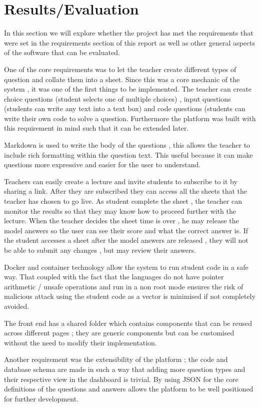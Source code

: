 \chapter{Results/Evaluation}

In this section we will explore whether the project has met the requirements that were set in the requirements section of this report as well as other general aspects of the software that can be evaluated.

One of the core requirements was to let the teacher create different types of question and collate them into a sheet. Since this was a core mechanic of the system , it was one of the first things to be implemented. The teacher can create choice questions (student selects one of multiple choices) , input questions (students can write any text into a text box) and code questions (students can write their own code to solve a question. Furthermore the platform was built with this requirement in mind such that it can be extended later.

Markdown is used to write the body of the questions , this allows the teacher to include rich formatting within the question text. This useful because it can make questions more expressive and easier for the user to understand.


Teachers can easily create a lecture and invite students to subscribe to it by sharing a link. After they are subscribed they can access all the sheets that the teacher has chosen to go live. As student complete the sheet , the teacher can monitor the results so that they may know how to proceed further with the lecture. 
When the teacher decides the sheet time is over , he may release the model answers so the user can see their score and what the correct answer is. If the student accesses a sheet after the model answers are released , they will not be able to submit any changes , but may review their answers.

Docker and container technology allow the system to run student code in a safe way. That coupled with the fact that the languages do not have pointer arithmetic / unsafe operations and run in a non root mode ensures the risk of malicious attack using the student code as a vector is minimised if not completely avoided.

The front end has a shared folder which contains components that can be reused across different pages ; they are generic components but can be customised without the need to modify their implementation.

Another requirement was the extensibility of the platform ; the code and database schema are made in such a way that adding more question types and their respective view in the dashboard is trivial. By using JSON for the core definitions of the questions and answers allows the platform to be well positioned for further development.

